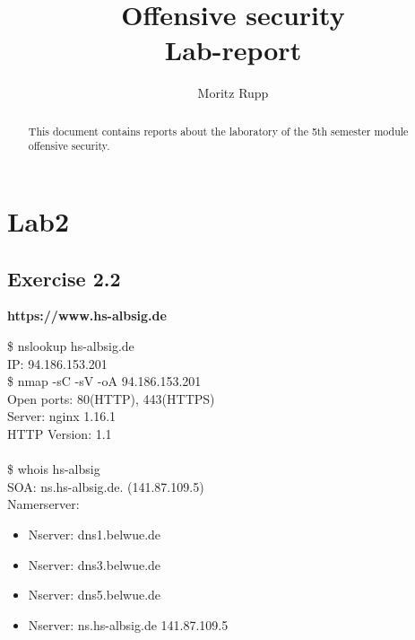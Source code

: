 \documentclass[a4paper,10pt]{article}
\title{Offensive security\\Lab-report}
\author{Moritz Rupp}
\begin{document}
\maketitle

\begin{abstract}
\noindent This document contains reports about the laboratory of the 5th semester module offensive security. 
\end{abstract}
\newpage
\section{Lab2}
\subsection{Exercise 2.2}
\begin{center}
\textbf{https://www.hs-albsig.de} 
\end{center}
\$\raisebox{-0.9ex}{\~{}} nslookup hs-albsig.de \\
IP: 94.186.153.201\\ 


\noindent\$\raisebox{-0.9ex}{\~{}} nmap -sC -sV -oA 94.186.153.201\\
Open ports: 80(HTTP), 443(HTTPS)\\
Server: nginx 1.16.1\\
HTTP Version: 1.1 
\\
\\
\$\raisebox{-0.9ex}{\~{}} whois hs-albsig\\
SOA: ns.hs-albsig.de. (141.87.109.5)\\  
Namerserver:
\begin{itemize}
\item Nserver: dns1.belwue.de
\item Nserver: dns3.belwue.de
\item Nserver: dns5.belwue.de
\item Nserver: ns.hs-albsig.de 141.87.109.5
\end{itemize}
\end{document}
